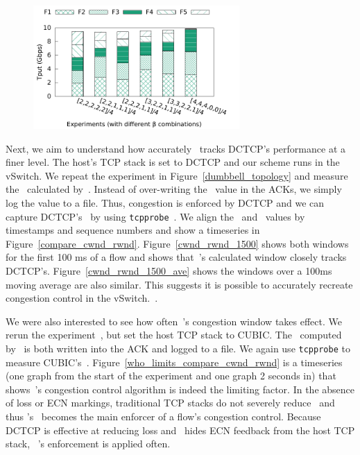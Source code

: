 \begin{figure}[!t]
        \centering
  \includegraphics[width=0.7\textwidth]{acdctcp/figures/qos/qos_stacked.pdf}
        \caption{}
        \label{cc-qos}
\end{figure}

Next, we aim to understand how accurately~\acdc{} tracks DCTCP's performance at a finer level. The host's TCP
stack is set to DCTCP and our scheme runs in the vSwitch.
We repeat the experiment in Figure~\ref{dumbbell_topology} and measure the~\rwnd{} calculated by~\acdc{}. Instead
of over-writing the~\rwnd{} value in the ACKs, we simply log the value to a file. Thus, congestion is enforced by DCTCP
and we can capture DCTCP's~\cwnd{} by using {\tt tcpprobe}~\cite{tcp-probe}. We align the~\rwnd{} and~\cwnd{} values by timestamps and sequence
numbers and show a timeseries in Figure~\ref{compare_cwnd_rwnd}. Figure~\ref{cwnd_rwnd_1500} shows both windows for the
first 100 ms of a flow and shows that~\acdc{}'s calculated window closely tracks DCTCP's. Figure~\ref{cwnd_rwnd_1500_ave} 
shows the windows over a 100ms moving average are also similar. This suggests it is possible to accurately recreate congestion
control in the vSwitch.~.

We were also interested to see how often~\acdc{}'s congestion window takes effect. We rerun the experiment~, but set
the host TCP stack to CUBIC. The~\rwnd{} computed by~\acdc{} is both written into the ACK and logged to a file. We again
use {\tt tcpprobe} to measure CUBIC's~\cwnd{}. Figure~\ref{who_limits_compare_cwnd_rwnd} is a timeseries (one graph from the
start of the experiment and one graph 2 seconds in) that shows~\acdc{}'s
congestion control algorithm is indeed the limiting factor.
In the absence of loss or ECN markings, traditional TCP stacks do not severely reduce~\cwnd{} and thus
\acdc{}'s~\rwnd{} becomes the main enforcer of a flow's congestion control. Because DCTCP 
is effective at reducing loss and~\acdc{} hides ECN feedback from the host TCP stack,
~\acdc{}'s enforcement is applied often.

